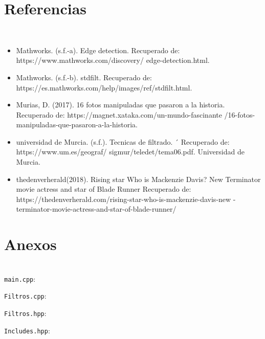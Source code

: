 \documentclass[11pt]{article}
\begin{document}
\section{Referencias}\\
\begin{itemize}
    \item Mathworks. (s.f.-a). Edge detection. Recuperado de: https://www.mathworks.com/discovery/
    edge-detection.html.
    \item Mathworks. (s.f.-b). stdfilt. Recuperado de: https://es.mathworks.com/help/images/ref/stdfilt.html.
    \item Murias, D. (2017). 16 fotos manipuladas que pasaron a la historia.
Recuperado de: https://magnet.xataka.com/un-mundo-fascinante
/16-fotos-manipuladas-que-pasaron-a-la-historia.
    \item universidad de Murcia. (s.f.). Tecnicas de filtrado. ´ Recuperado de: https://www.um.es/geograf/
    sigmur/teledet/tema06.pdf. Universidad de Murcia.
    \item thedenverherald(2018). Rising star Who is Mackenzie Davis? New Terminator movie actress and star of Blade Runner Recuperado de: https://thedenverherald.com/rising-star-who-is-mackenzie-davis-new
    -terminator-movie-actress-and-star-of-blade-runner/
\end{itemize}

\newpage
\section{Anexos}\\

\Large{\texttt{main.cpp}:}

\newpage
\Large{\texttt{Filtros.cpp}:}

\newpage
\Large{\texttt{Filtros.hpp}:}

\newpage
\Large{\texttt{Includes.hpp}:}

\end{document}
